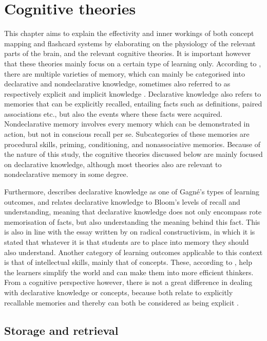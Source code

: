 \chapter{Cognitive theories}

\label{ch:theory}

This chapter aims to explain the effectivity and inner workings of both concept mapping and flashcard systems by elaborating on the physiology of the relevant parts of the brain, and the relevant cognitive theories. It is important however that these theories mainly focus on a certain type of learning only. According to , there are multiple varieties of memory, which can mainly be categorised into declarative and nondeclarative knowledge, sometimes also referred to as respectively explicit and implicit knowledge . Declarative knowledge also refers to memories that can be explicitly recalled, entailing facts such as definitions, paired associations etc., but also the events where these facts were acquired. Nondeclarative memory involves every memory which can be demonstrated in action, but not in conscious recall per se. Subcategories of these memories are procedural skills, priming, conditioning, and nonassociative memories. Because of the nature of this study, the cognitive theories discussed below are mainly focused on declarative knowledge, although most theories also are relevant to nondeclarative memory in some degree.

Furthermore,  describes declarative knowledge as one of Gagné's types of learning outcomes, and relates declarative knowledge to Bloom's levels of recall and understanding, meaning that declarative knowledge does not only encompass rote memorisation of facts, but also understanding the meaning behind this fact. This is also in line with the essay written by  on radical constructivism, in which it is stated that whatever it is that students are to place into memory they should also understand. Another category of learning outcomes applicable to this context is that of intellectual skills, mainly that of concepts. These, according to , help the learners simplify the world and can make them into more efficient thinkers. From a cognitive perspective however, there is not a great difference in dealing with declarative knowledge or concepts, because both relate to explicitly recallable memories and thereby can both be considered as being explicit \cite{squire}.

\section{Storage and retrieval}

